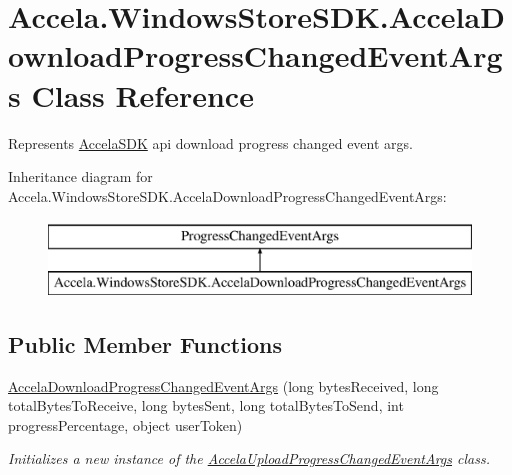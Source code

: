 \hypertarget{class_accela_1_1_windows_store_s_d_k_1_1_accela_download_progress_changed_event_args}{\section{Accela.\+Windows\+Store\+S\+D\+K.\+Accela\+Download\+Progress\+Changed\+Event\+Args Class Reference}
\label{class_accela_1_1_windows_store_s_d_k_1_1_accela_download_progress_changed_event_args}
}


Represents \hyperlink{class_accela_1_1_windows_store_s_d_k_1_1_accela_s_d_k}{Accela\+S\+D\+K} api download progress changed event args.  


Inheritance diagram for Accela.\+Windows\+Store\+S\+D\+K.\+Accela\+Download\+Progress\+Changed\+Event\+Args\+:\begin{figure}[H]
\begin{center}
\leavevmode
\includegraphics[height=2.000000cm]{class_accela_1_1_windows_store_s_d_k_1_1_accela_download_progress_changed_event_args}
\end{center}
\end{figure}
\subsection*{Public Member Functions}
\begin{DoxyCompactItemize}
\item 
\hyperlink{class_accela_1_1_windows_store_s_d_k_1_1_accela_download_progress_changed_event_args_a02e9c123124f21ea83a3f6751e83540b}{Accela\+Download\+Progress\+Changed\+Event\+Args} (long bytes\+Received, long total\+Bytes\+To\+Receive, long bytes\+Sent, long total\+Bytes\+To\+Send, int progress\+Percentage, object user\+Token)
\begin{DoxyCompactList}\small\item\em Initializes a new instance of the \hyperlink{class_accela_1_1_windows_store_s_d_k_1_1_accela_upload_progress_changed_event_args}{Accela\+Upload\+Progress\+Changed\+Event\+Args} class. \end{DoxyCompactList}\end{DoxyCompactItemize}


